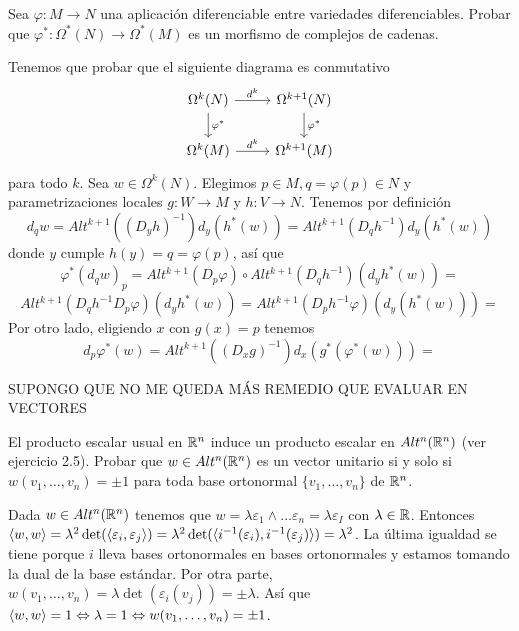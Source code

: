 \documentclass[twoside]{article}
\begin{document}
\begin{ejercicio}{9.11}
Sea $\varphi:M\to N$ una aplicación diferenciable entre variedades diferenciables. Probar que $\varphi^*:\Omega^*(N)\to\Omega^*(M)$ es un morfismo de complejos de cadenas.
\end{ejercicio}
\begin{solucion}
Tenemos que probar que el siguiente diagrama es conmutativo 
\[
\begin{tikzcd}
\Omega^k(N)\arrow[r,"d^k"]\arrow[d,"\varphi^*"] & \Omega^{k+1}(N)\arrow[d,"\varphi^*"]\\
\Omega^k(M)\arrow[r, "d^k"] & \Omega^{k+1}(M)
\end{tikzcd}
\]
para todo $k$. Sea $w\in\Omega^k(N)$. Elegimos $p\in M,q=\varphi(p)\in N$ y parametrizaciones locales $g:W\to M$ y $h:V\to N$. Tenemos por definición
\[
d_qw=Alt^{k+1}((D_yh)^{-1})d_y(h^*(w))=Alt^{k+1}(D_qh^{-1})d_y(h^*(w))
\]
donde $y$ cumple $h(y)=q=\varphi(p)$, así que
\[
\varphi^*(d_qw)_p=Alt^{k+1}(D_p\varphi)\circ Alt^{k+1}(D_qh^{-1})(d_yh^*(w))=
\]
\[
Alt^{k+1}(D_qh^{-1}D_p\varphi)(d_yh^*(w))=Alt^{k+1}(D_ph^{-1}\varphi)(d_y(h^*(w)))=
\]
% 
Por otro lado, 
eligiendo $x$ con  $g(x)=p$ tenemos
\[
d_p\varphi^*(w)=Alt^{k+1}((D_xg)^{-1})d_x(g^*(\varphi^*(w)))=
\]

SUPONGO QUE NO ME QUEDA MÁS REMEDIO QUE EVALUAR EN VECTORES
\end{solucion}

\newpage

\begin{ejercicio}{9.12}
El producto escalar usual en $\mathbb{R}^n$ induce un producto escalar en $Alt^n(\mathbb{R}^n)$ (ver ejercicio 2.5). Probar que $w\in Alt^n(\mathbb{R}^n)$ es un vector unitario si y solo si $w(v_1,\dots, v_n)=\pm 1$ para toda base ortonormal $\{v_1,\dots, v_n\}$ de $\mathbb{R}^n$.
\end{ejercicio}
\begin{solucion}
Dada $w\in Alt^n(\mathbb{R}^n)$ tenemos que $w=\lambda \varepsilon_1\land\dots\varepsilon_n=\lambda\varepsilon_I$ con $\lambda\in\mathbb{R}$. Entonces $\langle{w,w}\rangle=\lambda^2\det(\langle{\varepsilon_i,\varepsilon_j}\rangle)=\lambda^2\det(\langle{i^{-1}(\varepsilon_i),i^{-1}(\varepsilon_j)}\rangle)=\lambda^2$. La última igualdad se tiene porque $i$ lleva bases ortonormales en bases ortonormales y estamos tomando la dual de la base estándar. Por otra parte, $w(v_1,\dots, v_n)=\lambda\det(\varepsilon_i(v_j))=\pm\lambda$. Así que $\langle{w,w}\rangle=1\Leftrightarrow \lambda=1\Leftrightarrow w(v_1,\dots, v_n)=\pm 1$.
\end{solucion}
\end{document}
